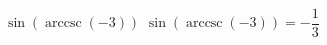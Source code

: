  {$\sin\left(\operatorname{arccsc}\left(-3\right)\right)$}
{ $\sin\left(\operatorname{arccsc}\left(-3\right)\right) = -\dfrac{1}{3}$ }
